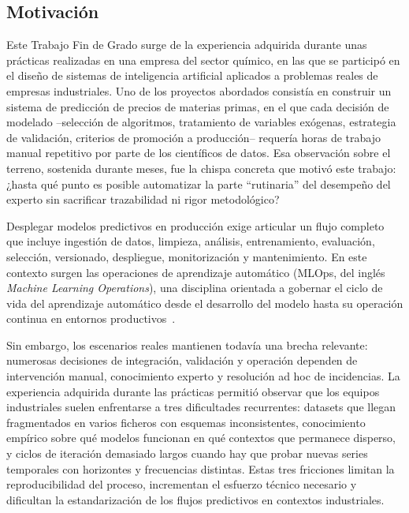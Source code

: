 \documentclass[12pt,a4paper]{article}
\theoremstyle{plain}
\begin{document}
\subsection{Motivación}

Este Trabajo Fin de Grado surge de la experiencia adquirida durante unas prácticas realizadas en una empresa del sector químico, en las que se participó en el diseño de sistemas de inteligencia artificial aplicados a problemas reales de empresas industriales. Uno de los proyectos abordados consistía en construir un sistema de predicción de precios de materias primas, en el que cada decisión de modelado --selección de algoritmos, tratamiento de variables exógenas, estrategia de validación, criterios de promoción a producción-- requería horas de trabajo manual repetitivo por parte de los científicos de datos. Esa observación sobre el terreno, sostenida durante meses, fue la chispa concreta que motivó este trabajo: ¿hasta qué punto es posible automatizar la parte ``rutinaria'' del desempeño del experto sin sacrificar trazabilidad ni rigor metodológico?

Desplegar modelos predictivos en producción exige articular un flujo completo que incluye ingestión de datos, limpieza, análisis, entrenamiento, evaluación, selección, versionado, despliegue, monitorización y mantenimiento. En este contexto surgen las operaciones de aprendizaje automático (MLOps, del inglés \emph{Machine Learning Operations}), una disciplina orientada a gobernar el ciclo de vida del aprendizaje automático desde el desarrollo del modelo hasta su operación continua en entornos productivos~\cite{aws_mlops}. %

Sin embargo, los escenarios reales mantienen todavía una brecha relevante: numerosas decisiones de integración, validación y operación dependen de intervención manual, conocimiento experto y resolución ad hoc de incidencias. %
La experiencia adquirida durante las prácticas permitió observar que los equipos industriales suelen enfrentarse a tres dificultades recurrentes: datasets que llegan fragmentados en varios ficheros con esquemas inconsistentes, conocimiento empírico sobre qué modelos funcionan en qué contextos que permanece disperso, y ciclos de iteración demasiado largos cuando hay que probar nuevas series temporales con horizontes y frecuencias distintas. Estas tres fricciones limitan la reproducibilidad del proceso, incrementan el esfuerzo técnico necesario y dificultan la estandarización de los flujos predictivos en contextos industriales.
\end{document}
